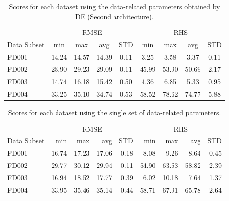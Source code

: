 \documentclass[12pt]{IEEEtran}%
\begin{document}
\begin{table}
\begin{center}
\caption
{Scores for each dataset using the data-related parameters obtained by DE (Second architecture).}%
%

\begin{tabular}
[c]{l|cccc|cccc}\hline
& \multicolumn{4}{|c}{RMSE} & \multicolumn{4}{|c}{RHS}\\
Data Subset & min & max & avg & STD & min & max & avg & STD\\\hline\hline
FD001 & 14.24 & 14.57 & 14.39 & 0.11 & 3.25 & 3.58 & 3.37 & 0.11\\
FD002 & 28.90 & 29.23 & 29.09 & 0.11 & 45.99 & 53.90 & 50.69 & 2.17\\
FD003 & 14.74 & 16.18 & 15.42 & 0.50 & 4.36 & 6.85 & 5.33 & 0.95\\
FD004 & 33.25 & 35.10 & 34.74 & 0.53 & 58.52 & 78.62 & 74.77 & 5.88\\\hline
\end{tabular}
\label{table:results_ann_de}%

\end{center}
\end{table}%
%

\begin{table}
\begin{center}
\caption
{Scores for each dataset using the single set of data-related parameters.}%
%

\begin{tabular}
[c]{l|rrrr|rrrr}\hline
& \multicolumn{4}{|c}{RMSE} & \multicolumn{4}{|c}{RHS}\\
Data Subset & min & max & avg & STD & min & max & avg & STD\\\hline\hline
FD001 & 16.74 & 17.23 & 17.06 & 0.18 & 8.08 & 9.26 & 8.64 & 0.45\\
FD002 & 29.77 & 30.12 & 29.94 & 0.11 & 54.90 & 63.53 & 58.82 & 2.39\\
FD003 & 16.94 & 18.52 & 17.77 & 0.39 & 6.02 & 10.18 & 7.64 & 1.37\\
FD004 & 33.95 & 35.46 & 35.14 & 0.44 & 58.71 & 67.91 & 65.78 & 2.64\\\hline
\end{tabular}
\label{table:results_ann_1}%
\end{center}
\end{table}%
%
\end{document}
